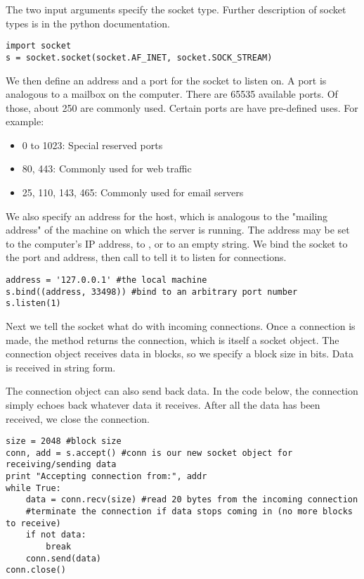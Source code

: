 The two input arguments specify the socket type. Further description of socket types is in the python documentation.

\begin{lstlisting}
import socket
s = socket.socket(socket.AF_INET, socket.SOCK_STREAM)
\end{lstlisting}

We then define an address and a port for the socket to listen on.
A port is analogous to a mailbox on the computer.
There are 65535 available ports.
Of those, about 250 are commonly used.
Certain ports are have pre-defined uses. For example:
\begin{itemize}
        \item 0 to 1023: Special reserved ports
        \item  80, 443: Commonly used for web traffic
        \item 25, 110, 143, 465: Commonly used for email servers
    \end{itemize}
We also specify an address for the host, which is analogous to the "mailing address" of the machine on which the server is running.
The address may be set to the computer's IP address, to , or to an empty string. We bind the socket to the port and address, then call  to tell it to listen for connections.


\begin{lstlisting}
address = '127.0.0.1' #the local machine
s.bind((address, 33498)) #bind to an arbitrary port number
s.listen(1)
\end{lstlisting}

Next we tell the socket what do with incoming connections.
Once a connection is made, the  method returns the connection, which is itself a socket object.
The connection object receives data in blocks, so we specify a block size in bits.
Data is received in string form.

The connection object can also send back data.
In the code below, the connection simply echoes back whatever data it receives.
After all the data has been received, we close the connection.


\begin{lstlisting}
size = 2048 #block size
conn, add = s.accept() #conn is our new socket object for receiving/sending data
print "Accepting connection from:", addr
while True:
	data = conn.recv(size) #read 20 bytes from the incoming connection
	#terminate the connection if data stops coming in (no more blocks to receive)
	if not data:
		break
	conn.send(data)
conn.close()
\end{lstlisting}


